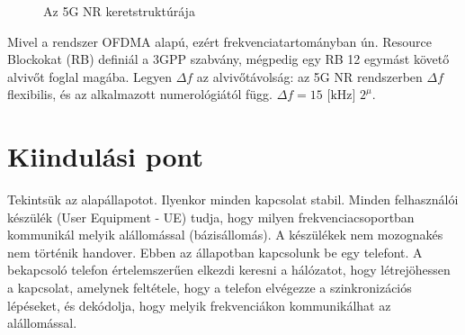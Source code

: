 \begin{figure}[h!]
    \centering
    \fboxsep=1mm
    \caption{Az 5G NR keretstruktúrája}
    \label{fig:slot}
\end{figure}



Mivel a rendszer OFDMA alapú, ezért frekvenciatartományban ún. Resource Blockokat (RB) definiál a 3GPP szabvány, mégpedig egy RB 12 egymást követő alvivőt foglal magába.
Legyen $\Delta f$ az alvivőtávolság: az 5G NR rendszerben $\Delta f$ flexibilis, és az alkalmazott numerológiától függ. $\Delta f = 15 \text{ [kHz] } 2^\mu$.


\section{Kiindulási pont}

Tekintsük az alapállapotot. Ilyenkor minden kapcsolat stabil.
Minden felhasználói készülék (User Equipment - UE) tudja, hogy milyen frekvenciacsoportban kommunikál melyik alállomással (bázisállomás).
A készülékek nem mozognakés nem történik handover.
Ebben az állapotban kapcsolunk be egy telefont.
A bekapcsoló telefon értelemszerűen elkezdi keresni a hálózatot, hogy létrejöhessen a kapcsolat, amelynek feltétele, hogy a telefon elvégezze a szinkronizációs lépéseket, és dekódolja, hogy melyik frekvenciákon kommunikálhat az alállomással.